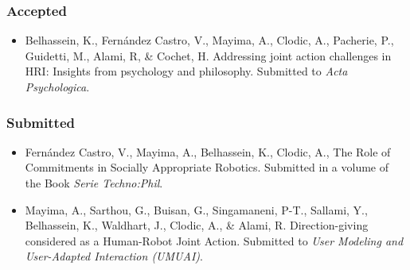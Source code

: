 \documentclass[a4paper,11pt,twoside]{StyleThese}
\begin{document}
\subsubsection*{Accepted}
\begin{itemize}
\item Belhassein, K., Fernández Castro, V., Mayima, A., Clodic, A., Pacherie, P., Guidetti, M., Alami, R, \& Cochet, H. Addressing joint action challenges in HRI: Insights from psychology
and philosophy. Submitted to \textit{Acta Psychologica}.
\end{itemize}

\subsubsection*{Submitted}
\begin{itemize}
\item Fernández Castro, V., Mayima, A., Belhassein, K., Clodic, A., The Role of Commitments in Socially Appropriate Robotics. Submitted in a volume of the Book \textit{Serie Techno:Phil}.

\item Mayima, A., Sarthou, G., Buisan, G., Singamaneni, P-T., Sallami, Y., Belhassein, K., Waldhart, J., Clodic, A., \& Alami, R. Direction-giving considered as a Human-Robot Joint
Action. Submitted to \textit{User Modeling and User-Adapted Interaction (UMUAI)}.
\end{itemize}	







 

\ifdefined{}
\else


\end{document}
